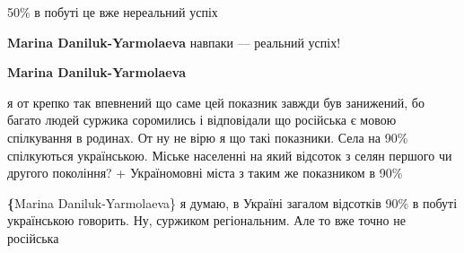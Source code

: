  
 
 
 
 

\begin{itemize}
 

50\% в побуті це вже нереальний успіх

\begin{itemize}
 
\textbf{Marina Daniluk-Yarmolaeva} навпаки — реальний успіх!

 
\textbf{Marina Daniluk-Yarmolaeva} 

я от крепко так впевнений що саме цей
показник завжди був занижений, бо багато людей суржика соромились і відповідали
що російська є мовою спілкування в родинах. От ну не вірю я що такі показники.
Села на 90\% спілкуються українською. Міське населенні на який відсоток з селян
першого чи другого покоління? + Україномовні міста з таким же показником в 90\%

 
\textbf\{Marina Daniluk-Yarmolaeva\} я думаю, в Україні загалом відсотків 90\% в
побуті українською говорить. Ну, суржиком регіональним. Але то вже точно не
російська


\end{itemize}
\end{itemize}
